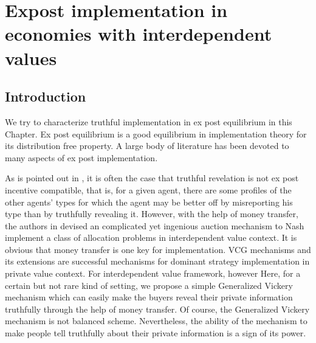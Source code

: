 
\chapter{Expost implementation in economies with  interdependent values}  %

\label{Chapter3} %




\section{Introduction}
 We try to characterize truthful implementation in ex post equilibrium in this Chapter.  Ex post equilibrium 
 is a good equilibrium in implementation theory for its distribution free property. A large body of literature has been devoted to 
 many aspects of ex post implementation. 

 

 As is pointed out in \parencite{Postlewaite2014}, it is often the case that truthful revelation is not ex post incentive compatible, that is, for a given 
 agent, there are some profiles of the other agents' types for which the agent may be better off by misreporting his type than by 
 truthfully revealing it. However, with the help of money transfer, the authors in \parencite{Maskin00} devised an complicated yet ingenious 
 auction mechanism to Nash implement a class of allocation problems in interdependent value context. It is obvious 
 that money transfer is one key for implementation. 
VCG mechanisms and its extensions are successful mechanisms for dominant strategy implementation in private value context. For interdependent value framework, however
 Here, for a certain but not rare kind of setting, we propose a simple Generalized Vickery mechanism which can easily make the buyers
 reveal their private information truthfully through the help of money transfer. Of course, the Generalized Vickery mechanism is not 
 balanced scheme. Nevertheless, the ability of the mechanism to make people tell truthfully about their private information is a sign of 
 its power.   

